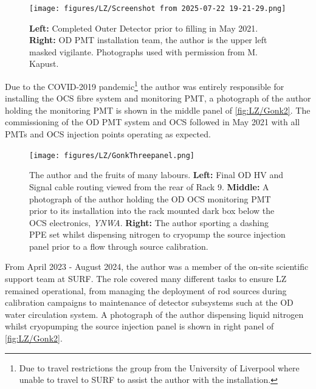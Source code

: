 \begin{figure}[ht!]
    \centering
    \texttt{[image: figures/LZ/Screenshot from 2025-07-22 19-21-29.png]}
    \caption[Completed Outer Detector prior to filling in May 2021 alongside OD PMT installation team.]{\textbf{Left:} Completed Outer Detector prior to filling in May 2021. \textbf{Right:} OD PMT installation team, the author is the upper left masked vigilante. Photographs used with permission from M. Kapust.}
    \label{fig:LZ/ODImg}
\end{figure}

Due to the COVID-2019 pandemic\footnote{Due to travel restrictions the group from the University of Liverpool where unable to travel to SURF to assist the author with the installation.} the author was entirely responsible for installing the OCS fibre system and monitoring PMT, a photograph of the author holding the monitoring PMT is shown in the middle panel of \autoref{fig:LZ/Gonk2}. The commissioning of the OD PMT system and OCS followed in May 2021 with all PMTs and OCS injection points operating as expected.

\begin{figure}[ht!]
    \centering
    \texttt{[image: figures/LZ/GonkThreepanel.png]}
    \caption[The author and the fruits of many labours.]{The author and the fruits of many labours. \textbf{Left:} Final OD HV and Signal cable routing viewed from the rear of Rack 9. \textbf{Middle:} A photograph of the author holding the OD OCS monitoring PMT prior to its installation into the rack mounted dark box below the OCS electronics, \textit{YNWA}. \textbf{Right:} The author sporting a dashing PPE set whilst dispensing nitrogen to cryopump the source injection panel prior to a flow through source calibration.}
    \label{fig:LZ/Gonk2}
\end{figure}

From April 2023 - August 2024, the author was a member of the on-site scientific support team at SURF. The role covered many different tasks to ensure LZ remained operational, from managing the deployment of rod sources during calibration campaigns to maintenance of detector subsystems such at the OD water circulation system. A photograph of the author dispensing liquid nitrogen whilst cryopumping the source injection panel is shown in right panel of \autoref{fig:LZ/Gonk2}.

